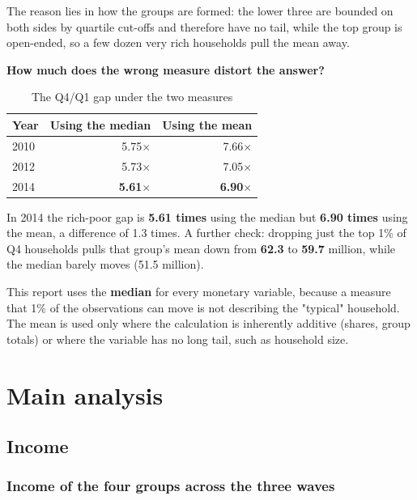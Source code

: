 \documentclass[11pt,a4paper]{article}
\newcommand{\n}[1]{\textbf{#1}}
\begin{document}
The reason lies in how the groups are formed: the lower three are bounded on both sides by quartile cut-offs and therefore have no tail, while the top group is open-ended, so a few dozen very rich households pull the mean away.

\textbf{How much does the wrong measure distort the answer?}

\begin{table}[H]\centering\small
\caption{The Q4/Q1 gap under the two measures}
\begin{tabular}{lrr}
\toprule
Year & Using the median & Using the mean\\
\midrule
2010 & 5.75$\times$ & 7.66$\times$\\
2012 & 5.73$\times$ & 7.05$\times$\\
2014 & \textbf{5.61}$\times$ & \textbf{6.90}$\times$\\
\bottomrule
\end{tabular}
\end{table}

In 2014 the rich-poor gap is \n{5.61 times} using the median but \n{6.90 times} using the mean, a difference of 1.3 times. A further check: dropping just the top 1\% of Q4 households pulls that group's mean down from \n{62.3} to \n{59.7} million, while the median barely moves (51.5 million).

\begin{kl}
This report uses the \n{median} for every monetary variable, because a measure that 1\% of the observations can move is not describing the "typical" household. The mean is used only where the calculation is inherently additive (shares, group totals) or where the variable has no long tail, such as household size.
\end{kl}

\section{Main analysis}

\subsection{Income}

\subsubsection{Income of the four groups across the three waves}
\end{document}
